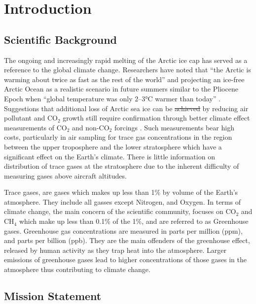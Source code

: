\documentclass[a4paper,12pt,twoside]{article}
\providecommand{\DIFaddtex}[1]{{\protect\color{blue}\uwave{#1}}} %
\providecommand{\DIFdeltex}[1]{{\protect\color{red}\sout{#1}}}                      %
\providecommand{\DIFaddbegin}{} %
\providecommand{\DIFaddend}{} %
\providecommand{\DIFdelbegin}{} %
\providecommand{\DIFdelend}{} %
\providecommand{\DIFadd}[1]{\texorpdfstring{\DIFaddtex{#1}}{#1}} %
\providecommand{\DIFdel}[1]{\texorpdfstring{\DIFdeltex{#1}}{}} %
\newcommand{\DIFscaledelfig}{0.5}
\newlength{\DIFdelgraphicswidth} %
\newlength{\DIFdelgraphicsheight} %
\newcommand{\DIFaddincludegraphics}[2][]{{\color{blue}\fbox{\DIFOincludegraphics[#1]{#2}}}} %
\newcommand{\DIFdelincludegraphics}[2][]{%
\sbox{\DIFdelgraphicsbox}{\DIFOincludegraphics[#1]{#2}}%
\settoboxwidth{\DIFdelgraphicswidth}{\DIFdelgraphicsbox} %
\settoboxtotalheight{\DIFdelgraphicsheight}{\DIFdelgraphicsbox} %
\scalebox{\DIFscaledelfig}{%
\parbox[b]{\DIFdelgraphicswidth}{\usebox{\DIFdelgraphicsbox}\\[-\baselineskip] \rule{\DIFdelgraphicswidth}{0em}}\llap{\resizebox{\DIFdelgraphicswidth}{\DIFdelgraphicsheight}{%
\setlength{\unitlength}{\DIFdelgraphicswidth}%
\begin{picture}(1,1)%
\thicklines\linethickness{2pt} %
{\color[rgb]{1,0,0}\put(0,0){\framebox(1,1){}}}%
{\color[rgb]{1,0,0}\put(0,0){\line( 1,1){1}}}%
{\color[rgb]{1,0,0}\put(0,1){\line(1,-1){1}}}%
\end{picture}%
}\hspace*{3pt}}} %
} %
\DeclareRobustCommand{\DIFaddbegin}{\DIFOaddbegin \let\includegraphics\DIFaddincludegraphics} %
\DeclareRobustCommand{\DIFaddend}{\DIFOaddend \let\includegraphics\DIFOincludegraphics} %
\DeclareRobustCommand{\DIFdelbegin}{\DIFOdelbegin \let\includegraphics\DIFdelincludegraphics} %
\DeclareRobustCommand{\DIFdelend}{\DIFOaddend \let\includegraphics\DIFOincludegraphics} %
\begin{document}
%

\section{Introduction}
\subsection{Scientific Background}

The ongoing and increasingly rapid melting of the Arctic ice cap has served as a reference to the global climate change. Researchers have noted that \enquote{the Arctic is warming about twice as fast as the rest of the world} \cite{Perkins} and projecting an ice-free Arctic Ocean as a realistic scenario in future summers similar to the Pliocene Epoch when \enquote{global temperature was only 2–3°C warmer than today} \cite{Trace}. Suggestions that additional loss of Arctic sea ice can be \DIFdelbegin \DIFdel{achieved }\DIFdelend \DIFaddbegin \DIFadd{avoided }\DIFaddend by reducing air pollutant and CO$_{2}$ growth still require confirmation through better climate effect measurements of CO$_{2}$ and non-CO$_{2}$ forcings \cite{Trace}. Such measurements bear high costs, particularly in air sampling for trace gas concentrations in the region between the upper troposphere and the lower stratosphere which have a significant effect on the Earth's climate. There is little information on distribution of trace gases at the stratosphere due to the inherent difficulty of measuring gases above aircraft altitudes.

Trace gases, are gases which makes up less than 1\% by volume of the Earth's atmosphere. They include all gasses except Nitrogen, and Oxygen. In terms of climate change, the main concern of the scientific community, focuses on CO$_2$ and CH$_4$ which make up less than 0.1\% of the 1\%, and are referred to as Greenhouse gases. Greenhouse gas concentrations are measured in parts per million (ppm), and parts per billion (ppb). They are the main offenders of the greenhouse effect, released by human activity as they trap heat into the atmosphere. Larger emissions of greenhouse gases lead to higher concentrations of those gases in the atmosphere thus contributing to climate change.

\subsection{Mission Statement}
\end{document}
